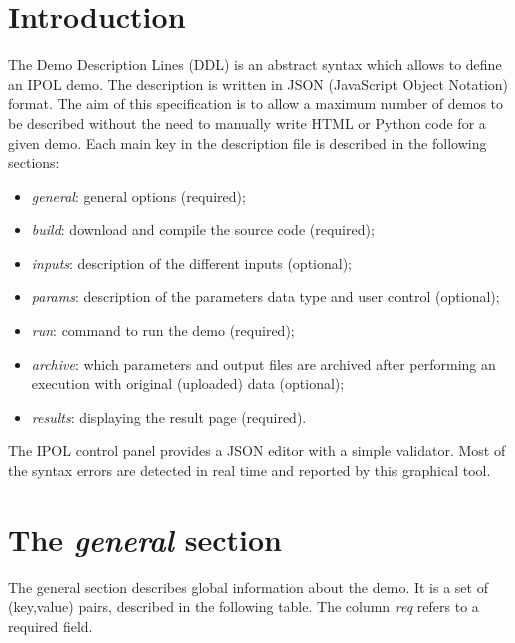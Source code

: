 \section{Introduction}
The Demo Description Lines (DDL) is an abstract syntax which allows
to define an IPOL demo. The description is 
written in JSON (JavaScript Object Notation) format. The aim of this specification is to allow a maximum number of demos to be described without the
need to manually write HTML or Python code for a given demo. Each main key in the description file is described in the following sections:

\begin{itemize}
  \item \textit{general}: general options (required);
  \item \textit{build}: download and compile the source code (required);
  \item \textit{inputs}: description of the different inputs  (optional);
  \item \textit{params}: description of the parameters data type and user control (optional);
  \item \textit{run}: command to run the demo (required);
  \item \textit{archive}: which parameters and output files are archived after performing an execution with original (uploaded) data (optional);
  \item \textit{results}: displaying the result page (required).
\end{itemize}

\vspace{1em}

The IPOL control panel provides a JSON editor with a simple validator. Most of the syntax errors are detected in real time
and reported by this graphical tool.

\section{The \emph{general} section}
The general section describes global information about the demo.
It is a set of (key,value) pairs, described in the following table. The column \emph{req} refers to a required field.

